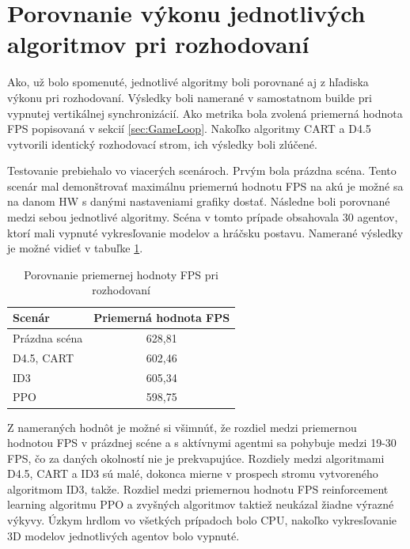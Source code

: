 \documentclass[slovak, master]{diploma}
\begin{document}
\section{Porovnanie výkonu jednotlivých algoritmov pri rozhodovaní}
\label{sec:editorPerformance}
Ako, už bolo spomenuté, jednotlivé algoritmy boli porovnané aj z hľadiska výkonu pri rozhodovaní. Výsledky boli namerané v samostatnom builde pri vypnutej vertikálnej synchronizácií. Ako metrika bola zvolená priemerná hodnota FPS popisovaná v sekcií \ref{sec:GameLoop}. Nakoľko algoritmy CART a D4.5 vytvorili identický rozhodovací strom, ich výsledky boli zlúčené. 

Testovanie prebiehalo vo viacerých scenároch. Prvým bola prázdna scéna. Tento scenár mal demonštrovať maximálnu priemernú hodnotu FPS na akú je možné sa na danom HW s danými nastaveniami grafiky dostať. Následne boli porovnané medzi sebou jednotlivé algoritmy. Scéna v tomto prípade obsahovala 30 agentov, ktorí mali vypnuté vykresľovanie modelov a hráčsku postavu. Namerané výsledky je možné vidieť v tabuľke \ref{tab:benchmarksGame}.

\begin{table}[!ht]
    \centering
    \begin{tabular}{|l|c|}
    \hline
        \textbf{Scenár} & \textbf{Priemerná hodnota FPS} \\ \hline
        Prázdna scéna & 628,81 \\ 
        D4.5, CART & 602,46 \\ 
        ID3 & 605,34 \\ 
        PPO & 598,75 \\ \hline
    \end{tabular}
    \caption{Porovnanie priemernej hodnoty FPS pri rozhodovaní}
    \label{tab:benchmarksGame}
\end{table}

Z nameraných hodnôt je možné si všimnúť, že rozdiel medzi priemernou hodnotou FPS v prázdnej scéne a s aktívnymi agentmi sa pohybuje medzi 19-30 FPS, čo za daných okolností nie je prekvapujúce. Rozdiely medzi algoritmami D4.5, CART a ID3 sú malé, dokonca mierne v prospech stromu vytvoreného algoritmom ID3, takže. Rozdiel medzi priemernou hodnotu FPS reinforcement learning algoritmu PPO a zvyšných algoritmov taktiež neukázal žiadne výrazné výkyvy. Úzkym hrdlom vo všetkých prípadoch bolo CPU, nakoľko vykresľovanie 3D modelov jednotlivých agentov bolo vypnuté. 
\end{document}

